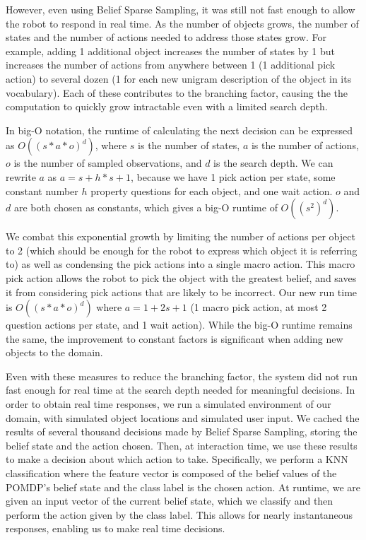 \documentclass[letterpaper]{article}
\begin{document}
However, even using Belief Sparse Sampling, it was still not fast enough to allow the robot to respond in real time. As the number of objects grows, the number of states and the number of actions needed to address those states grow. For example, adding 1 additional object increases the number of states by 1 but increases the number of actions from anywhere between 1 (1 additional pick action) to several dozen (1 for each new unigram description of the object in its vocabulary). Each of these contributes to the branching factor, causing the the computation to quickly grow intractable even with a limited search depth. 

In big-O notation, the runtime of calculating the next decision can be expressed as $O((s*a*o)^d)$, where $s$ is the number of states, $a$ is the number of actions, $o$ is the number of sampled observations, and $d$ is the search depth. We can rewrite $a$ as $a = s + h*s+ 1$, because we have 1 pick action per state, some constant number $h$ property questions for each object, and one wait action. $o$ and $d$ are both chosen as constants, which gives a big-O runtime of $O((s^2)^d)$. 




We combat this exponential growth by limiting the number of actions per object to 2 (which should be enough for the robot to express which object it is referring to) as well as condensing the pick actions into a single macro action. This macro pick action allows the robot to pick the object with the greatest belief, and saves it from considering pick actions that are likely to be incorrect. Our new run time is $O((s*a*o)^d)$ where $a = 1 + 2s + 1$ (1 macro pick action, at most 2 question actions per state, and 1 wait action). While the big-O runtime remains the same, the improvement to constant factors is significant when adding new objects to the domain. 



Even with these measures to reduce the branching factor, the system did not run fast enough for real time at the search depth needed for meaningful decisions. In order to obtain real time responses, we run a simulated environment of our domain, with simulated object locations and simulated user input. We cached the results of several thousand decisions made by Belief Sparse Sampling, storing the belief state and the action chosen. Then, at interaction time, we use these results to make a decision about which action to take. Specifically, we perform a KNN classification where the feature vector is composed of the belief values of the POMDP's belief state and the class label is the chosen action. At runtime, we are given an input vector of the current belief state, which we classify and then perform the action given by the class label. This allows for nearly instantaneous responses, enabling us to make real time decisions. 
\end{document}
